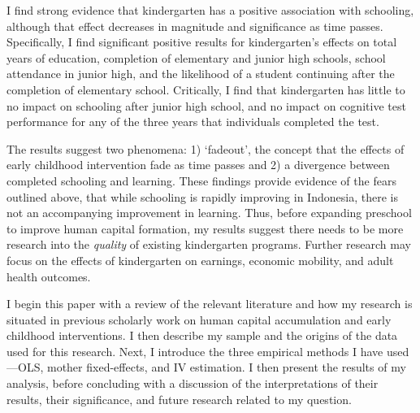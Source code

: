 I find strong evidence that kindergarten has a positive association with schooling, although that effect decreases in magnitude and significance as time passes. Specifically, I find significant positive results for kindergarten’s effects on total years of education, completion of elementary and junior high schools, school attendance in junior high, and the likelihood of a student continuing after the completion of elementary school. Critically, I find that kindergarten has little to no impact on schooling after junior high school, and no impact on cognitive test performance for any of the three years that individuals completed the test. 

The results suggest two phenomena: 1) `fadeout', the concept that the effects of early childhood intervention fade as time passes and 2) a divergence between completed schooling and learning. These findings provide evidence of the fears outlined above, that while schooling is rapidly improving in Indonesia, there is not an accompanying improvement in learning. Thus, before expanding preschool to improve human capital formation, my results suggest there needs to be more research into the \textit{quality} of existing kindergarten programs. Further research may focus on the effects of kindergarten on earnings, economic mobility, and adult health outcomes.

I begin this paper with a review of the relevant literature and how my research is situated in previous scholarly work on human capital accumulation and early childhood interventions. I then describe my sample and the origins of the data used for this research. Next, I introduce the three empirical methods I have used—OLS, mother fixed-effects, and IV estimation. I then present the results of my analysis, before concluding with a discussion of the interpretations of their results, their significance, and future research related to my question.